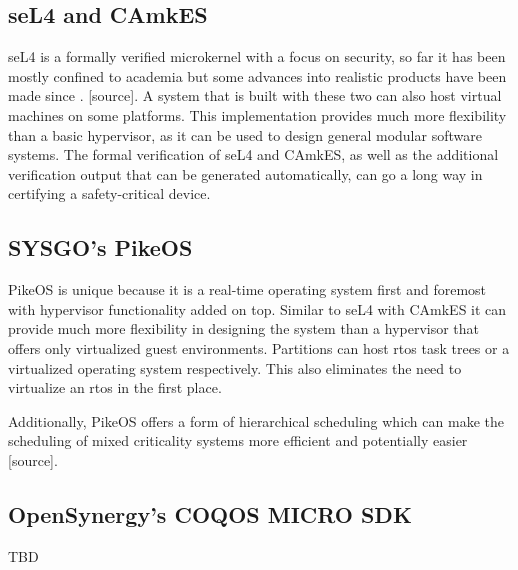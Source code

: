 \subsection{seL4 and CAmkES} \label{seL4}
seL4 is a formally verified microkernel with a focus on security, so far it has been mostly confined to academia but some advances into realistic products have been made since \cite{fisher2012hacms}. [source]. A system that is built with these two can also host virtual machines on some platforms. This implementation provides much more flexibility than a basic hypervisor, as it can be used to design general modular software systems. The formal verification of seL4 and CAmkES, as well as the additional verification output that can be generated automatically, can go a long way in certifying a safety-critical device.
\subsection{SYSGO's PikeOS}
PikeOS is unique because it is a real-time operating system first and foremost with hypervisor functionality added on top. Similar to seL4 with CAmkES it can provide much more flexibility in designing the system than a hypervisor that offers only virtualized guest environments. Partitions can host \acrshort{rtos} task trees or a virtualized operating system respectively. This also eliminates the need to virtualize an \acrshort{rtos} in the first place.

Additionally, PikeOS offers a form of hierarchical scheduling which can make the scheduling of mixed criticality systems more efficient and potentially easier [source].
\subsection{OpenSynergy's COQOS MICRO SDK}
TBD

